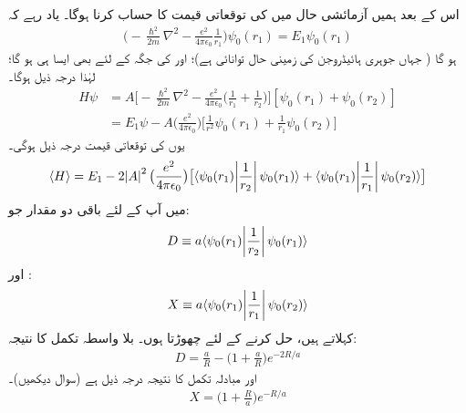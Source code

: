  اس کے بعد ہمیں آزمائشی حال  میں  کی توقعاتی قیمت کا حساب کرنا ہوگا۔ یاد رہے کہ 
 \begin{align*}
\big(-\frac{\hslash^{2}}{2m}\nabla^{2}-\frac{e^{2}}{4\pi\epsilon_{0}}\frac{1}{r_{1}}\big)\psi_{0}(r_{1})=E_{1}\psi_{0}(r_{1})
\end{align*}
ہو گا ( جہاں  جوہری ہائیڈروجن کی زمینی حال توانائی ہے)؛ اور  کی جگہ  کے لئے بھی ایسا ہی ہو گا؛ لہٰذا درجہ ذیل ہوگا۔
\begin{align*}
 H\psi&=A\big[-\frac{\hslash^{2}}{2m}\nabla^{2}-\frac{e^{2}}{4\pi\epsilon_{0}}\big(\frac{1}{r_{1}}+\frac{1}{r_{2}}\big)\big][\psi_{0}(r_{1})+\psi_{0}(r_{2})]\\
&=E_{1}\psi-A\big(\frac{e^{2}}{4\pi\epsilon_{0}}\big)\big[\frac{1}{r^{2}}\psi_{0}(r_{1})+\frac{1}{r_{1}}\psi_{0}(r_{2})\big]
\end{align*}
 یوں کی توقعاتی قیمت درجہ ذیل ہوگی۔
\begin{align}
\langle H \rangle =E_{1}-2\abs{A}^{2}\big(\frac{e^{2}}{4\pi\epsilon_{0}}\big)\big[\langle \psi_{0}(r_{1})\abs{\frac{1}{r_{2}}}\psi_{0}(r_{1})\rangle +\langle \psi_{0}(r_{1})\abs{\frac{1}{r_{1}}}\psi_{0}(r_{2})\rangle\big]
\end{align}
 میں آپ کے لئے باقی دو مقدار جو: 
\begin{align}\label{مساوات_تغیریت_بلاواسطہ_تکمل}
D\equiv a\langle \psi_{0}(r_{1})\abs{\frac{1}{r_{2}}}\psi_{0}(r_{1})\rangle
\end{align}
 اور : 
\begin{align}\label{مساوات_تغیریت_مبادلہ_تکمل}
X\equiv a\langle\psi_{0}(r_{1})\abs{\frac{1}{r_{1}}}\psi_{0}(r_{2})\rangle
\end{align}
 کہلاتے ہیں، حل کرنے کے لئے چھوڑتا ہوں۔ بلا واسطہ تکمل کا نتیجہ:
\begin{align}\label{مساوات_تغیریت_نتیجہ_بلاواسطہ_تکمل}
D=\frac{a}{R}-\big(1+\frac{a}{R}\big)e^{-2R/a} 
\end{align}
 اور مبادلہ تکمل کا نتیجہ درجہ ذیل ہے (سوال  دیکھیں)۔ 
\begin{align}\label{مساوات_تغیریت_نتیجہ_مبادلہ_تکمل}
X=\big(1+\frac{R}{a}\big)e^{-R/a} 
\end{align}

